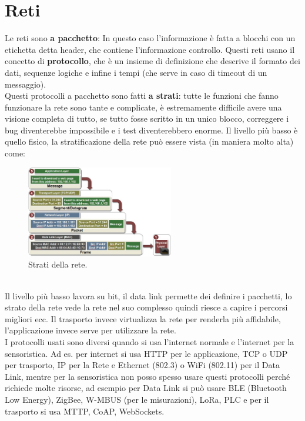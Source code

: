 \documentclass[11pt, twocolumn]{article}
\begin{document}
\section{Reti}
Le reti sono 
\textbf{a pacchetto}: In questo caso l'informazione è fatta a blocchi con un etichetta detta header, che contiene l'informazione controllo.
Questi reti usano il concetto di \textbf{protocollo}, che è un insieme di definizione che descrive il formato dei dati, sequenze logiche e infine i tempi (che serve in caso di timeout di un messaggio).\\
Questi protocolli a pacchetto sono fatti \textbf{a strati}: tutte le funzioni che fanno funzionare la rete sono tante e complicate, è estremamente difficile avere una visione completa di tutto, se tutto fosse scritto in un unico blocco, correggere i bug diventerebbe impossibile e i test diventerebbero enorme. Il livello più basso è quello fisico, la stratificazione della rete può essere vista (in maniera molto alta) come:
\begin{figure}[!h]
  \centering
  \includegraphics[width=\linewidth,height=4cm]{imgs/network.jpeg}
  \caption{Strati della rete.}
  \label{fig:Network}
\end{figure}\\
Il livello più basso lavora su bit, il data link permette dei definire i pacchetti, lo strato della rete vede la rete nel suo complesso quindi riesce a capire i percorsi migliori ecc. Il trasporto invece virtualizza la rete per renderla più affidabile, l'applicazione invece serve per utilizzare la rete.\\
I protocolli usati sono diversi quando si usa l'internet normale e l'internet per la sensoristica.
Ad es. per internet si usa HTTP per le applicazione, TCP o UDP per trasporto, IP per la Rete e Ethernet (802.3) o WiFi (802.11) per il Data Link, mentre per la sensoristica non posso spesso usare questi protocolli perché richiede molte risorse, ad esempio per Data Link si può usare BLE (Bluetooth Low Energy), ZigBee, W-MBUS (per le misurazioni), LoRa, PLC e per il trasporto si usa MTTP, CoAP, WebSockets.\\
\end{document}
